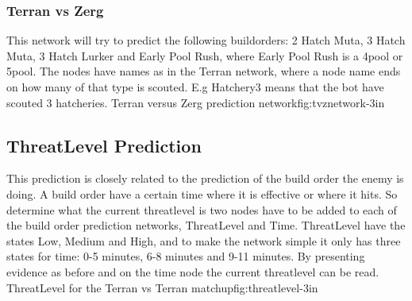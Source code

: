 \subsubsection{Terran vs Zerg}
	This network will try to predict the following buildorders: 2 Hatch Muta, 3 Hatch Muta, 3 Hatch Lurker and Early Pool Rush, 
	where Early Pool Rush is a 4pool or 5pool. The nodes have names as in the Terran network, where a node name ends on how many of that type is scouted. 
	E.g Hatchery3 means that the bot have scouted 3 hatcheries.
			{Terran versus Zerg prediction network}{fig:tvznetwork}{-3in}
			
			
\subsection{ThreatLevel Prediction}
	This prediction is closely related to the prediction of the build order the enemy is doing. A build order have a certain time where it is effective 
	or where it hits. So determine what the current threatlevel is two nodes have to be added to each of the build order prediction networks, 
	ThreatLevel and Time. ThreatLevel have the states Low, Medium and High, and to make the network simple it only has three states for time: 0-5 minutes, 
	6-8 minutes and 9-11 minutes. By presenting evidence as before and on the time node the current threatlevel can be read.
			{ThreatLevel for the Terran vs Terran matchup}{fig:threatlevel}{-3in}











 
